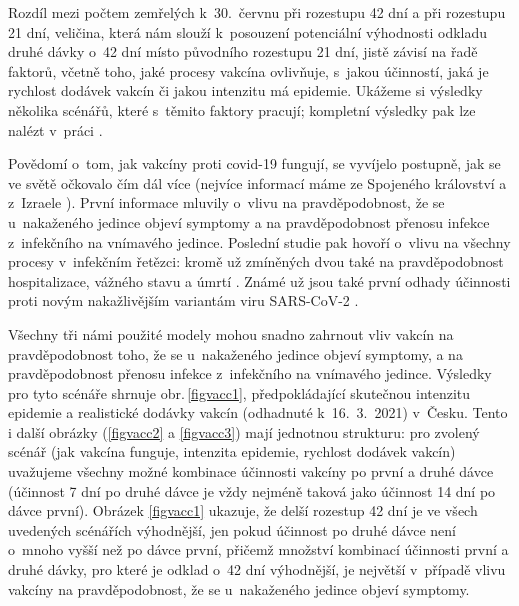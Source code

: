 
Rozdíl mezi počtem zemřelých k~30.\ červnu při rozestupu 42 dní a při rozestupu 21 dní, veličina, která nám slouží k~posouzení potenciální výhodnosti odkladu druhé dávky o~42 dní místo původního rozestupu 21 dní, jistě závisí na řadě faktorů, včetně toho, jaké procesy vakcína ovlivňuje, s~jakou účinností, jaká je rychlost dodávek vakcín či jakou intenzitu má epidemie. Ukážeme si výsledky několika scénářů, které s~těmito faktory pracují; kompletní výsledky pak lze nalézt v~práci \cite{vaccpaper}.

Povědomí o~tom, jak vakcíny proti covid-19 fungují, se vyvíjelo postupně, jak se ve světě očkovalo čím dál více (nejvíce informací máme ze Spojeného království \cite{Hall_etal2021,Vasileiou_etal2021} a z~Izraele \cite{Haas_etal2021}). První informace mluvily o~vlivu na pravděpodobnost, že se u~nakaženého jedince objeví symptomy a na pravděpodobnost přenosu infekce z~infekčního na vnímavého jedince. Poslední studie pak hovoří o~vlivu na všechny procesy v~infekčním řetězci: kromě už zmíněných dvou také na pravděpodobnost hospitalizace, vážného stavu a úmrtí \cite{Haas_etal2021}. Známé už jsou také první odhady účinnosti proti novým nakažlivějším variantám viru SARS-CoV-2 \cite[a reference uvnitř]{Shapiro_etal2021,delta}. 

Všechny tři námi použité modely mohou snadno zahrnout vliv vakcín na prav\-dě\-po\-dob\-nost toho, že se u~nakaženého jedince objeví symptomy, a na pravděpodobnost přenosu infekce z~infekčního na vnímavého jedince. Výsledky pro tyto scénáře shrnuje obr.\,\ref{figvacc1}, předpokládající skutečnou intenzitu epidemie a realistické dodávky vakcín (odhadnuté k~16.\ 3.\ 2021) v~Česku. Tento i další obrázky (\ref{figvacc2} a \ref{figvacc3}) mají jednotnou strukturu: pro zvolený scénář (jak vakcína funguje, intenzita epidemie, rychlost dodávek vakcín) uvažujeme všechny možné kombinace účinnosti vakcíny po první a druhé dávce (účinnost 7 dní po druhé dávce je vždy nejméně taková jako účinnost 14 dní po dávce první). Obrázek \ref{figvacc1} ukazuje, že delší rozestup 42 dní je ve všech uvedených scénářích výhodnější, jen pokud účinnost po druhé dávce není o~mnoho vyšší než po dávce první, přičemž množství kombinací účinnosti první a druhé dávky, pro které je odklad o~42 dní výhodnější, je největší v~případě vlivu vakcíny na pravděpodobnost, že se u~nakaženého jedince objeví symptomy.

